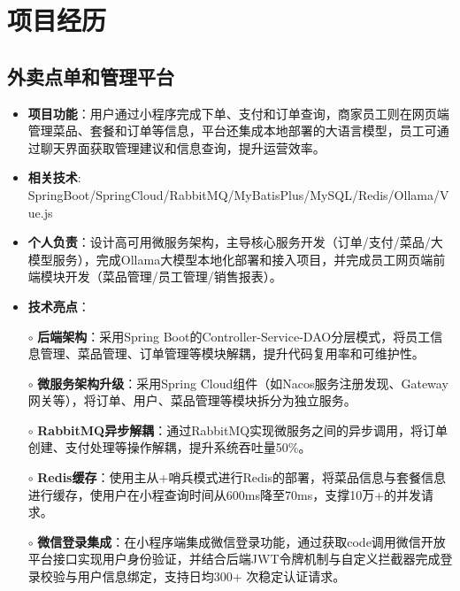 \documentclass{resume}
\begin{document}
\section{项目经历}

\subsection{\textbf{外卖点单和管理平台} \hspace{2cm}{2024.12 -- 2025.04}}
    \begin{normalsize}
      \begin{itemize}
        \item \textbf{项目功能}：用户通过小程序完成下单、支付和订单查询，商家员工则在网页端管理菜品、套餐和订单等信息，​平台还集成本地部署的大语言模型，员工可通过聊天界面获取管理建议和信息查询，提升运营效率。
        \item \textbf{相关技术}: SpringBoot/SpringCloud/RabbitMQ/MyBatisPlus/MySQL/Redis/Ollama/Vue.js
        \item \textbf{个人负责}：设计高可用微服务架构，主导核心服务开发（订单/支付/菜品/大模型服务），完成Ollama大模型本地化部署和接入项目，并完成员工网页端前端模块开发（菜品管理/员工管理/销售报表）。
        \item \textbf{技术亮点}：
        \setlength{\itemindent}{1em} %
          \item[$\circ$] \textbf{后端架构}：采用Spring Boot的Controller-Service-DAO分层模式，将员工信息管理、菜品管理、订单管理等模块解耦，提升代码复用率和可维护性。
          \item[$\circ$] \textbf{微服务架构升级}：采用Spring Cloud组件（如Nacos服务注册发现、Gateway网关等），将订单、用户、菜品管理等模块拆分为独立服务。
          \item[$\circ$] \textbf{RabbitMQ异步解耦​​}：通过RabbitMQ实现微服务之间的异步调用，将订单创建、支付处理等操作解耦，提升系统吞吐量50\%。
          \item[$\circ$] \textbf{Redis缓存}：使用主从+哨兵模式进行Redis的部署，将菜品信息与套餐信息进行缓存，使用户在小程查询时间从600ms降至70ms，支撑10万+的并发请求。
          \item[$\circ$] \textbf{微信登录集成}：在小程序端集成微信登录功能，通过获取code调用微信开放平台接口实现用户身份验证，并结合后端JWT令牌机制与自定义拦截器完成登录校验与用户信息绑定，支持日均300+ 次稳定认证请求。

\end{itemize}
\end{normalsize}
\end{document}
